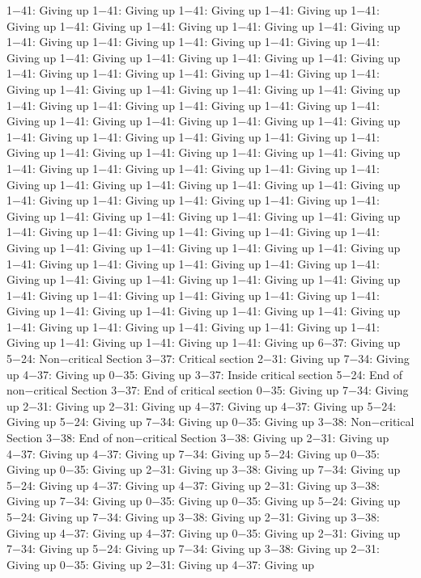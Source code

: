 1−41: Giving up
1−41: Giving up
1−41: Giving up
1−41: Giving up
1−41: Giving up
1−41: Giving up
1−41: Giving up
1−41: Giving up
1−41: Giving up
1−41: Giving up
1−41: Giving up
1−41: Giving up
1−41: Giving up
1−41: Giving up
1−41: Giving up
1−41: Giving up
1−41: Giving up
1−41: Giving up
1−41: Giving up
1−41: Giving up
1−41: Giving up
1−41: Giving up
1−41: Giving up
1−41: Giving up
1−41: Giving up
1−41: Giving up
1−41: Giving up
1−41: Giving up
1−41: Giving up
1−41: Giving up
1−41: Giving up
1−41: Giving up
1−41: Giving up
1−41: Giving up
1−41: Giving up
1−41: Giving up
1−41: Giving up
1−41: Giving up
1−41: Giving up
1−41: Giving up
1−41: Giving up
1−41: Giving up
1−41: Giving up
1−41: Giving up
1−41: Giving up
1−41: Giving up
1−41: Giving up
1−41: Giving up
1−41: Giving up
1−41: Giving up
1−41: Giving up
1−41: Giving up
1−41: Giving up
1−41: Giving up
1−41: Giving up
1−41: Giving up
1−41: Giving up
1−41: Giving up
1−41: Giving up
1−41: Giving up
1−41: Giving up
1−41: Giving up
1−41: Giving up
1−41: Giving up
1−41: Giving up
1−41: Giving up
1−41: Giving up
1−41: Giving up
1−41: Giving up
1−41: Giving up
1−41: Giving up
1−41: Giving up
1−41: Giving up
1−41: Giving up
1−41: Giving up
1−41: Giving up
1−41: Giving up
1−41: Giving up
1−41: Giving up
1−41: Giving up
1−41: Giving up
1−41: Giving up
1−41: Giving up
1−41: Giving up
1−41: Giving up
1−41: Giving up
1−41: Giving up
1−41: Giving up
1−41: Giving up
1−41: Giving up
1−41: Giving up
1−41: Giving up
1−41: Giving up
1−41: Giving up
1−41: Giving up
1−41: Giving up
1−41: Giving up
1−41: Giving up
6−37: Giving up
5−24: Non−critical Section
3−37: Critical section
2−31: Giving up
7−34: Giving up
4−37: Giving up
0−35: Giving up
3−37: Inside critical section
5−24: End of non−critical Section
3−37: End of critical section
0−35: Giving up
7−34: Giving up
2−31: Giving up
2−31: Giving up
4−37: Giving up
4−37: Giving up
5−24: Giving up
5−24: Giving up
7−34: Giving up
0−35: Giving up
3−38: Non−critical Section
3−38: End of non−critical Section
3−38: Giving up
2−31: Giving up
4−37: Giving up
4−37: Giving up
7−34: Giving up
5−24: Giving up
0−35: Giving up
0−35: Giving up
2−31: Giving up
3−38: Giving up
7−34: Giving up
5−24: Giving up
4−37: Giving up
4−37: Giving up
2−31: Giving up
3−38: Giving up
7−34: Giving up
0−35: Giving up
0−35: Giving up
5−24: Giving up
5−24: Giving up
7−34: Giving up
3−38: Giving up
2−31: Giving up
3−38: Giving up
4−37: Giving up
4−37: Giving up
0−35: Giving up
2−31: Giving up
7−34: Giving up
5−24: Giving up
7−34: Giving up
3−38: Giving up
2−31: Giving up
0−35: Giving up
2−31: Giving up
4−37: Giving up
